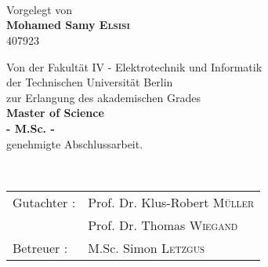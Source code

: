\begin{titlepage}
\begin{center}
\vspace*{2.0cm}
 \\
\vspace*{0.2cm}
 \\
\vspace*{0.2cm}
 \\

\vspace*{1.5cm}
\noindent \large {Vorgelegt von\\}
\vspace*{0.1cm}
\noindent \large {\bf Mohamed Samy \textsc{Elsisi}} \\
\vspace*{0.1cm}
\noindent \large {407923\\}
\vspace*{1.5cm}

\noindent \large {Von der Fakult\"at IV - Elektrotechnik und Informatik} \\
\vspace*{0.1cm}
\noindent \large {der Technischen Universit\"at Berlin} \\
\vspace*{0.1cm}
\noindent \large {zur Erlangung des akademischen Grades} \\
\vspace*{0.2cm}
\noindent \large {\bf Master of Science} \\
\vspace*{0.1cm}
\noindent \large {\bf - M.Sc. -} \\
\vspace*{0.2cm}
\noindent \large {genehmigte Abschlussarbeit.} \\
\vspace*{1.5cm}

\vspace*{0.1cm}
~\\
\begin{tabular}{ll}
      \vspace*{0.1cm}
      \noindent \large{Gutachter :}	& \noindent \large{Prof. Dr. Klus-Robert \textsc{Müller}}\\
      \vspace*{0.1cm}
					& \noindent \large{Prof. Dr. Thomas \textsc{Wiegand}}\\
	\vspace*{0.1cm}
	\noindent \large{Betreuer :}	& \noindent \large{M.Sc. Simon \textsc{Letzgus}}
\end{tabular}

\vspace*{1.5cm}

\end{center}
\end{titlepage}
\sloppy

\titlepage
